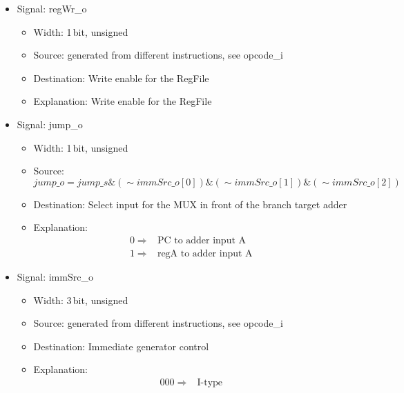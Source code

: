 \begin{itemize}
\begin{itemize}
    \item Explanation: \[ \begin{array}{ll} 
                                              0 \Rightarrow & \mbox{1st RegFile output to 1st source input of ALU} \\ 
                                              1 \Rightarrow & \mbox{PC to 1st source input of ALU} 
                                              \end{array} \]
  \end{itemize}
  \item Signal: regWr\_o
  \begin{itemize}
    \item Width: 1\,bit, unsigned
    \item Source: generated from different instructions, see opcode\_i
    \item Destination: Write enable for the RegFile
    \item Explanation: Write enable for the RegFile
  \end{itemize}
  \item Signal: jump\_o
  \begin{itemize}
    \item Width: 1\,bit, unsigned
    \item Source: \[ jump\_o = jump\_s \& (\sim immSrc\_o[0]) \& (\sim immSrc\_o[1]) \& (\sim immSrc\_o[2]) \]
    \item Destination: Select input for the MUX in front of the branch target adder
    \item Explanation: \[ \begin{array}{ll} 
                                              0 \Rightarrow & \mbox{PC to adder input A} \\ 
                                              1 \Rightarrow & \mbox{regA to adder input A} 
                                              \end{array} \]
  \end{itemize}
  \item Signal: immSrc\_o
  \begin{itemize}
    \item Width: 3\,bit, unsigned
    \item Source: generated from different instructions, see opcode\_i
    \item Destination: Immediate generator control
    \item Explanation: \[ \begin{array}{ll} 
                                              000 \Rightarrow & \mbox{I-type} \\ 

\end{array}\]
\end{itemize}
\end{itemize}
